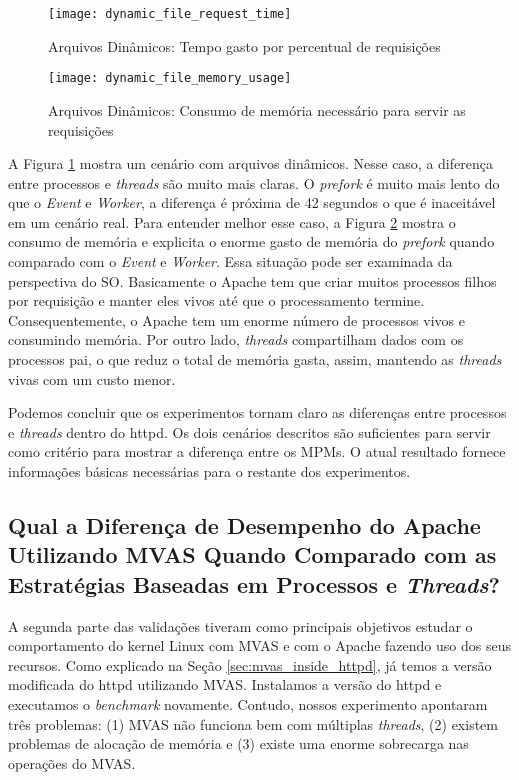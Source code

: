 \begin{figure}[!h]
  \centering
  \texttt{[image: dynamic\_file\_request\_time]}

  \caption{Arquivos Dinâmicos: Tempo gasto por percentual de requisições}
  \label{fig:dynamic_file}
\end{figure}

\begin{figure}[!h]
  \centering
  \texttt{[image: dynamic\_file\_memory\_usage]}

  \caption{Arquivos Dinâmicos: Consumo de memória necessário para servir as requisições}
  \label{fig:dynamic_file_memory}
\end{figure}

A Figura \ref{fig:dynamic_file} mostra um cenário com arquivos dinâmicos. Nesse
caso, a diferença entre processos e \emph{threads} são muito mais claras. O
\emph{prefork} é muito mais lento do que o \emph{Event} e \emph{Worker}, a
diferença é próxima de 42 segundos o que é inaceitável em um cenário real.
Para entender melhor esse caso, a Figura \ref{fig:dynamic_file_memory} mostra o
consumo de memória e explicita o enorme gasto de memória do \emph{prefork}
quando comparado com o \emph{Event} e \emph{Worker}. Essa situação pode ser
examinada da perspectiva do SO. Basicamente o Apache tem que criar muitos
processos filhos por requisição e manter eles vivos até que o processamento
termine. Consequentemente, o Apache tem um enorme número de processos vivos e
consumindo memória. Por outro lado, \emph{threads} compartilham dados com os
processos pai, o que reduz o total de memória gasta, assim, mantendo as
\emph{threads} vivas com um custo menor.

Podemos concluir que os experimentos tornam claro as diferenças entre processos
e \emph{threads} dentro do httpd. Os dois cenários descritos são suficientes
para servir como critério para mostrar a diferença entre os MPMs. O atual
resultado fornece informações básicas necessárias para o restante dos
experimentos.

\subsection{Qual a Diferença de Desempenho do Apache Utilizando MVAS Quando
Comparado com as Estratégias Baseadas em Processos e \emph{Threads}?}

A segunda parte das validações tiveram como principais objetivos estudar o
comportamento do kernel Linux com MVAS e com o Apache fazendo uso dos seus
recursos. Como explicado na Seção \ref{sec:mvas_inside_httpd}, já temos a
versão modificada do httpd utilizando MVAS. Instalamos a versão do httpd e
executamos o \emph{benchmark} novamente. Contudo, nossos experimento apontaram
três problemas: (1) MVAS não funciona bem com múltiplas \emph{threads}, (2)
existem problemas de alocação de memória e (3) existe uma enorme sobrecarga nas
operações do MVAS.

